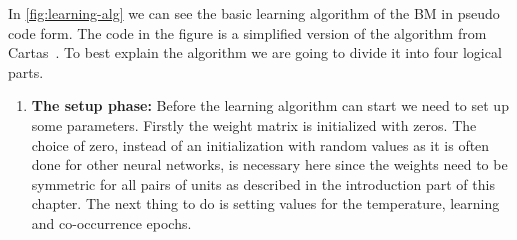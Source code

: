 \documentclass[12pt,twoside]{article}
\theoremstyle{plain}
\theoremstyle{definition}
\theoremstyle{remark}
\begin{document}
In \cref{fig:learning-alg} we can see the basic learning algorithm of the BM in pseudo code form.
The code in the figure is a simplified version of the algorithm from Cartas~\cite{BMImpl}.
To best explain the algorithm we are going to divide it into four logical parts.
\begin{enumerate}
    \item \textbf{The setup phase:}\newline
        Before the learning algorithm can start we need to set up some parameters. Firstly the weight matrix is initialized with zeros.
        The choice of zero, instead of an initialization with random values as it is often done for other neural networks, is
        necessary here since the weights need to be symmetric for all pairs of units as described in the introduction part of this chapter.
        The next thing to do is setting values for the temperature, learning and co-occurrence epochs. 
        

\end{enumerate}
\end{document}
